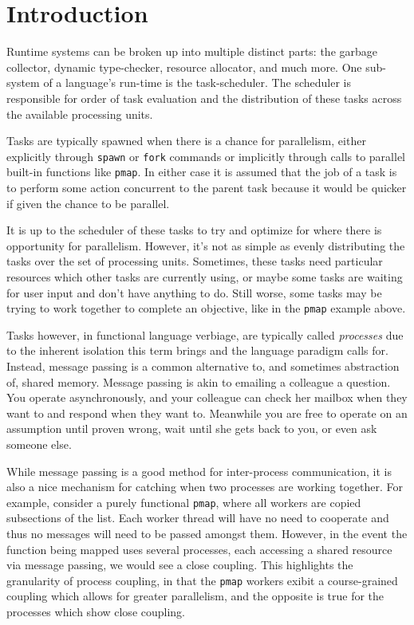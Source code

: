 \chapter{Introduction}
%
\label{chap:introduction}

Runtime systems can be broken up into multiple distinct parts: the garbage 
collector, dynamic type-checker, resource allocator, and much more. One 
sub-system of a language's run-time is the task-scheduler. The scheduler is 
responsible for order of task evaluation and the distribution of 
these tasks across the available processing units.

Tasks are typically spawned when there is a chance for parallelism, either 
explicitly through \texttt{spawn} or \texttt{fork} commands or implicitly 
through calls to parallel built-in functions like \texttt{pmap}. In either 
case it is assumed that the job of a task is to perform some action concurrent 
to the parent task because it would be quicker if given the chance to be 
parallel.

It is up to the scheduler of these tasks to try and optimize for where there
is opportunity for parallelism. However, it's not as simple as evenly 
distributing the tasks over the set of processing units. Sometimes, these 
tasks need particular resources which other tasks are currently using,
or maybe some tasks are waiting for user input and don't have anything to
do. Still worse, some tasks may be trying to work together to complete an 
objective, like in the \texttt{pmap} example above.

Tasks however, in functional language verbiage, are typically called 
{\em processes} due to the inherent isolation this term brings and the language 
paradigm calls for. Instead, message passing is a common alternative to, and 
sometimes abstraction of, shared
memory. Message passing is akin to emailing a colleague a question. You operate
asynchronously, and your colleague can check her mailbox when they want to and 
respond when they want to. Meanwhile you are free to operate on an assumption 
until proven wrong, wait until she gets back to you, or even ask someone else.

While message passing is a good method for inter-process communication, it is
also a nice mechanism for catching when two processes are working together.
For example, consider a purely functional \texttt{pmap}, where all 
workers are copied subsections of the list. Each worker thread will have no
need to cooperate and thus no messages will need to be passed amongst them.
However, in the event the function being mapped uses several processes, each 
accessing a shared resource via message passing, we would see a close coupling.
This highlights the granularity of process coupling, in that the \texttt{pmap}
workers exibit a course-grained coupling which allows for greater parallelism,
and the opposite is true for the processes which show close coupling.

